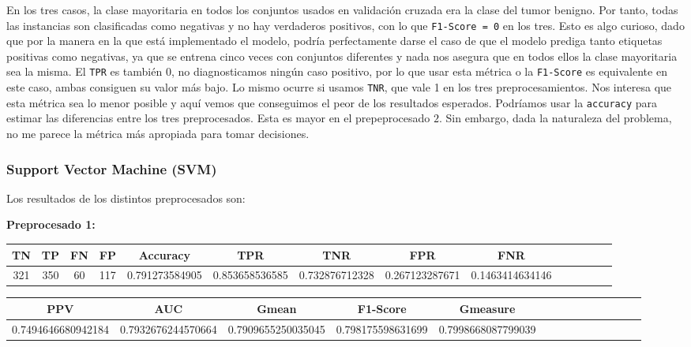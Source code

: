 \documentclass[a4]{article}
\begin{document}
\vspace{5mm}
En los tres casos, la clase mayoritaria en todos los conjuntos usados en validación cruzada era la clase del tumor benigno. Por tanto, todas las instancias son clasificadas como negativas y no hay verdaderos positivos, con lo que \texttt{F1-Score = 0} en los tres. Esto es algo curioso, dado que por la manera en la que está implementado el modelo, podría perfectamente darse el caso de que el modelo prediga tanto etiquetas positivas como negativas, ya que se entrena cinco veces con conjuntos diferentes y nada nos asegura que en todos ellos la clase mayoritaria sea la misma. El \texttt{TPR} es también $0$, no diagnosticamos ningún caso positivo, por lo que usar esta métrica o la \texttt{F1-Score} es equivalente en este caso, ambas consiguen su valor más bajo. Lo mismo ocurre si usamos \texttt{TNR}, que vale 1 en los tres preprocesamientos. Nos interesa que esta métrica sea lo menor posible y aquí vemos que conseguimos el peor de los resultados esperados. Podríamos usar la \texttt{accuracy}  para estimar las diferencias entre los tres preprocesados. Esta es mayor en el prepeprocesado $2$. Sin embargo, dada la naturaleza del problema, no me parece la métrica más apropiada para tomar decisiones.

\subsubsection{Support Vector Machine (SVM)}

Los resultados de los distintos preprocesados son:

\vspace{-1mm}
\textbf{Preprocesado 1:}
\begin{center}
\begin{tabular}{|c|c|c|c|c|c|c|c|c|c|c|c|c|c|}
\hline
\multicolumn{1}{|c|}{\textbf{TN}}& \textbf{TP} & \textbf{FN} & \textbf{FP} & \textbf{Accuracy} & \textbf{TPR} & \textbf{TNR} & \textbf{FPR} &\textbf{FNR} \\ \hline
  321 & 350 & 60 & 117 & 0.791273584905 & 0.853658536585 & 0.732876712328 & 0.267123287671 & 0.1463414634146 \\ \hline
\end{tabular}
\end{center}

\begin{center}
\begin{tabular}{|c|c|c|c|c|c|c|c|c|c|c|c|c|c|}
\hline
\multicolumn{1}{|c|}{\textbf{PPV}} & \textbf{AUC} & \textbf{Gmean} & \textbf{F1-Score} & \textbf{Gmeasure}  \\ \hline
  0.7494646680942184 & 0.7932676244570664 & 0.7909655250035045 & 0.798175598631699 & 0.7998668087799039 \\ \hline
\end{tabular}
\end{center}
\end{document}
